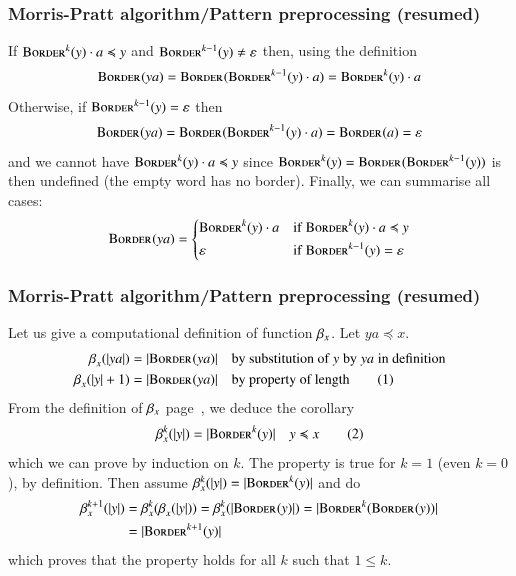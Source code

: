 %
\begin{frame}
\frametitle{Morris-Pratt algorithm/Pattern preprocessing (resumed)}

\label{border_def}

If \(\textsc{Border}^{k}(y) \cdot a \preccurlyeq y\) and \(\textsc{Border}^{k-1}(y) \neq
\varepsilon\) then, using the definition
\[
  \textsc{Border}^{}(ya)
= \textsc{Border}^{}(\textsc{Border}^{k-1}(y) \cdot a)
= \textsc{Border}^{k}(y) \cdot a
\]
Otherwise, if \(\textsc{Border}^{k-1}(y) = \varepsilon\) then
\[
  \textsc{Border}^{}(ya)
= \textsc{Border}^{}(\textsc{Border}^{k-1}(y) \cdot a)
= \textsc{Border}^{}(a)
= \varepsilon
\]
and we cannot have \(\textsc{Border}^{k}(y) \cdot a \preccurlyeq y\) since
\(\textsc{Border}^{k}(y) = \textsc{Border}^{}(\textsc{Border}^{k-1}(y))\) is then
undefined (the empty word has no border). Finally, we can summarise
all cases:
\[
\textsc{Border}^{}(ya) =
\left\{
  \begin{aligned}
   & \textsc{Border}^{k}(y) \cdot a
   && \text{if} \; \textsc{Border}^{k}(y) \cdot a \preccurlyeq y\\
   & \varepsilon
   && \text{if} \; \textsc{Border}^{k-1}(y) = \varepsilon
  \end{aligned}
\right.
\]

\end{frame}

%
\begin{frame}
\frametitle{Morris-Pratt algorithm/Pattern preprocessing (resumed)}

\label{condition}

Let us give a computational definition of function
\(\beta_{x}\). Let \(ya \preccurlyeq x\).
\begin{align*}
   \beta_{x}^{}(\lvert{ya}\lvert{})
&= \lvert{\textsc{Border}^{}(ya)}\lvert{}
&& \text{by substitution of} \; y \; \text{by}
                             \; ya \; \text{in definition}\\
   \beta_{x}^{}(\lvert{y}\lvert{}+1)
&= \lvert{\textsc{Border}^{}(ya)}\lvert{}
&& \text{by property of length} \tag{1}
\end{align*}
From the definition of \(\beta_{x}\)
page~\pageref{MP_supply_def}, we deduce the corollary
\[
\beta_{x}^{k}(\lvert{y}\lvert{}) = \lvert{\textsc{Border}^{k}(y)}\lvert{} \quad y \preccurlyeq x \tag{2}
\]
which we can prove by induction on \(k\). The property is true for
\(k=1\) (even \(k=0\)), by definition. Then assume
\(\beta_{x}^{k}(\lvert{y}\lvert{}) = \lvert{\textsc{Border}^{k}(y)}\lvert{}\) and do
\begin{align*}
  \beta_{x}^{k+1}(\lvert{y}\lvert{})
&= \beta_{x}^{k}(\beta_{x}^{}(\lvert{y}\lvert{}))
= \beta_{x}^{k}(\lvert{\textsc{Border}^{}(y)}\lvert{})
= \lvert{\textsc{Border}^{k}(\textsc{Border}^{}(y))}\lvert{}\\
&= \lvert{\textsc{Border}^{k+1}(y)}\lvert{}
\end{align*}
which proves that the property holds for all \(k\) such that \( 1
\leqslant k\).

\end{frame}

